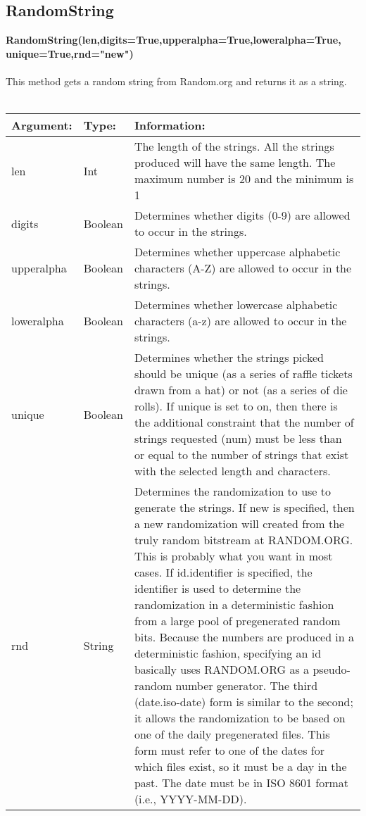 \documentclass[12 pt]{report}
\begin{document}
\subsection{RandomString}

\textbf{RandomString(len,digits=True,upperalpha=True,loweralpha=True,}
\textbf{unique=True,rnd="new")}\\\\
This method gets a random string from Random.org and returns it as a string.\\\\
  \begin{tabular}{ | l | l | p{10cm} | }
    \hline
    \textbf{Argument:} & \textbf{Type:} & \textbf{Information:} \\ \hline
    len & Int &The length of the strings. All the strings produced will have the same length. The maximum number is 20 and the minimum is 1 \\ \hline
    digits & Boolean & Determines whether digits (0-9) are allowed to occur in the strings. \\ \hline
    upperalpha & Boolean & Determines whether uppercase alphabetic characters (A-Z) are allowed to occur in the strings. \\ \hline
    loweralpha & Boolean & Determines whether lowercase alphabetic characters (a-z) are allowed to occur in the strings. \\ \hline
    unique & Boolean &  Determines whether the strings picked should be unique (as a series of raffle tickets drawn from a hat) or not (as a series of die rolls). If unique is set to on, then there is the additional constraint that the number of strings requested (num) must be less than or equal to the number of strings that exist with the selected length and characters. \\ \hline
    rnd & String & Determines the randomization to use to generate the strings. If new is specified, then a new randomization will created from the truly random bitstream at RANDOM.ORG. This is probably what you want in most cases. If id.identifier is specified, the identifier is used to determine the randomization in a deterministic fashion from a large pool of pregenerated random bits. Because the numbers are produced in a deterministic fashion, specifying an id basically uses RANDOM.ORG as a pseudo-random number generator. The third (date.iso-date) form is similar to the second; it allows the randomization to be based on one of the daily pregenerated files. This form must refer to one of the dates for which files exist, so it must be a day in the past. The date must be in ISO 8601  format (i.e., YYYY-MM-DD). \\
    \hline
  \end{tabular}
\end{document}

